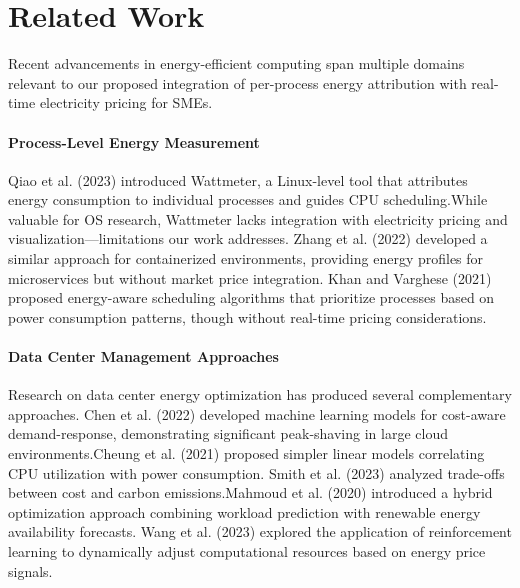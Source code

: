 

\section{Related Work}
Recent advancements in energy-efficient computing span multiple domains relevant to our proposed
integration of per-process energy attribution with real-time electricity pricing for SMEs.

\paragraph{Process-Level Energy Measurement}
Qiao et al. (2023) introduced Wattmeter, a Linux-level tool that attributes energy consumption to
individual processes and guides CPU scheduling.While valuable for OS research, Wattmeter lacks
integration with electricity pricing and visualization—limitations our work addresses.
Zhang et al. (2022) developed a similar approach for containerized environments, providing energy
profiles for microservices but without market price integration. Khan and Varghese (2021) proposed
energy-aware scheduling algorithms that prioritize processes based on power consumption patterns,
though without real-time pricing considerations.
\cite{qiao2023wattmeter,zhang2022container,khan2021energy}

\paragraph{Data Center Management Approaches}
Research on data center energy optimization has produced several complementary approaches.
Chen et al. (2022) developed machine learning models for cost-aware demand-response, demonstrating
significant peak-shaving in large cloud environments.Cheung et al. (2021) proposed simpler linear
models correlating CPU utilization with power consumption. Smith et al. (2023) analyzed trade-offs
between cost and carbon emissions.Mahmoud et al. (2020) introduced a hybrid optimization approach
combining workload prediction with renewable energy availability forecasts.
Wang et al. (2023) explored the application of reinforcement learning to dynamically adjust
computational resources based on energy price signals.
\cite{chen2022datacentermodel,cheung2021utilizationmodel,smith2023warofefficiencies,mahmoud2020cost,wang2023reinforcement}

